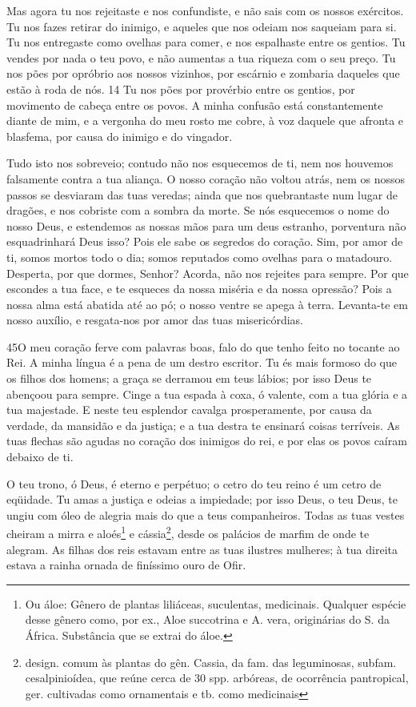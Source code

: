 Mas agora tu nos rejeitaste e nos confundiste, e não sais com os
nossos exércitos. Tu nos fazes retirar do inimigo, e aqueles
que nos odeiam nos saqueiam para si. Tu nos entregaste como
ovelhas para comer, e nos espalhaste entre os gentios. Tu
vendes por nada o teu povo, e não aumentas a tua riqueza com o seu
preço. Tu nos pões por opróbrio aos nossos vizinhos, por
escárnio e zombaria daqueles que estão à roda de nós. 14 Tu nos pões
por provérbio entre os gentios, por movimento de cabeça entre os
povos. A minha confusão está constantemente diante de mim, e
a vergonha do meu rosto me cobre, à voz daquele que afronta e
blasfema, por causa do inimigo e do vingador.

Tudo isto nos sobreveio; contudo não nos esquecemos de ti, nem
nos houvemos falsamente contra a tua aliança. O nosso coração
não voltou atrás, nem os nossos passos se desviaram das tuas
veredas; ainda que nos quebrantaste num lugar de dragões, e
nos cobriste com a sombra da morte. Se nós esquecemos o nome
do nosso Deus, e estendemos as nossas mãos para um deus estranho,
porventura não esquadrinhará Deus isso? Pois ele sabe os
segredos do coração. Sim, por amor de ti, somos mortos todo o
dia; somos reputados como ovelhas para o matadouro. Desperta,
por que dormes, Senhor? Acorda, não nos rejeites para sempre.
Por que escondes a tua face, e te esqueces da nossa miséria e
da nossa opressão? Pois a nossa alma está abatida até ao pó;
o nosso ventre se apega à terra. Levanta-te em nosso auxílio,
e resgata-nos por amor das tuas misericórdias.

\bigskip

\lettrine{45}{}O meu coração ferve com palavras boas, falo do
que tenho feito no tocante ao Rei. A minha língua é a pena de um
destro escritor. Tu és mais formoso do que os filhos dos homens;
a graça se derramou em teus lábios; por isso Deus te abençoou para
sempre. Cinge a tua espada à coxa, ó valente, com a tua glória e
a tua majestade. E neste teu esplendor cavalga prosperamente,
por causa da verdade, da mansidão e da justiça; e a tua destra te
ensinará coisas terríveis. As tuas flechas são agudas no coração
dos inimigos do rei, e por elas os povos caíram debaixo de ti.

O teu trono, ó Deus, é eterno e perpétuo; o cetro do teu reino é
um cetro de eqüidade. Tu amas a justiça e odeias a impiedade;
por isso Deus, o teu Deus, te ungiu com óleo de alegria mais do que
a teus companheiros. Todas as tuas vestes cheiram a mirra e
aloés\footnote{Ou áloe: Gênero de plantas liliáceas, suculentas,
medicinais. Qualquer espécie desse gênero como, por ex., Aloe
succotrina e A. vera, originárias do S. da África. Substância que se
extrai do áloe.} e cássia\footnote{design. comum às plantas do gên.
Cassia, da fam. das leguminosas, subfam. cesalpinioídea, que reúne
cerca de 30 spp. arbóreas, de ocorrência pantropical, ger.
cultivadas como ornamentais e tb. como medicinais}, desde os
palácios de marfim de onde te alegram. As filhas dos reis
estavam entre as tuas ilustres mulheres; à tua direita estava a
rainha ornada de finíssimo ouro de Ofir.

